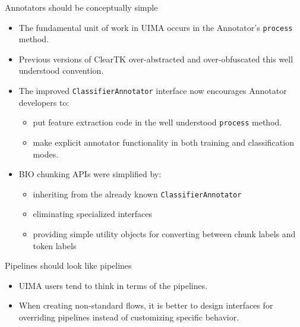 \documentclass[final]{beamer}
\newcommand{\code}[1]{\texttt{\small #1}}
\begin{document}
\begin{frame}{}
\begin{columns}[t]
\begin{column}{.45\linewidth}
    \begin{block}{Annotators should be conceptually simple}
      \begin{itemize}
      \item The fundamental unit of work in UIMA occurs in the Annotator's \code{process} method.
      \item Previous versions of ClearTK over-abstracted and over-obfuscated this well understood convention.
      \item The improved \code{ClassifierAnnotator} interface now encourages Annotator developers to:
          \begin{itemize}
          \item put feature extraction code in the well understood \code{process} method.
          \item make explicit annotator functionality in both training and classification modes.
          \end{itemize}
      \item BIO chunking APIs were simplified by:
          \begin{itemize}
          \item inheriting from the already known \code{ClassifierAnnotator}
          \item eliminating specialized interfaces
          \item providing simple utility objects for converting between chunk labels and token labels
          \end{itemize}
      \end{itemize}

    \end{block}

    \begin{block}{Pipelines should look like pipelines}
      \begin{itemize}
      \item UIMA users tend to think in terms of the pipelines.  
      \item When creating non-standard flows, it is better to design interfaces for overriding pipelines instead of customizing specific behavior.
          

\end{itemize}
\end{block}
\end{column}
\end{columns}
\end{frame}
\end{document}
